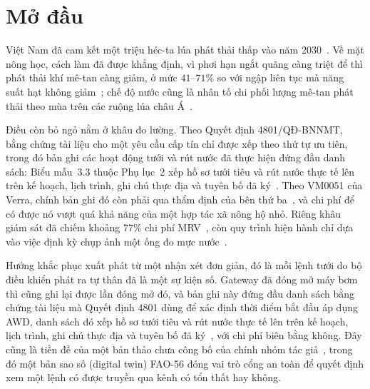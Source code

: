 \section{Mở đầu}
\label{sec:intro}

Việt Nam đã cam kết một triệu héc-ta lúa phát thải thấp vào năm 2030~\cite{qd1490}.
Về mặt nông học, cách làm đã được khẳng định, vì phơi hạn ngắt quãng càng triệt
để thì phát thải khí mê-tan càng giảm, ở mức $41$--$71\%$ so với ngập liên tục mà
năng suất hạt không giảm~\cite{balaine2019}; chế độ nước cũng là nhân tố chi
phối lượng mê-tan phát thải theo mùa trên các ruộng lúa châu Á~\cite{yan2005}.

Điều còn bỏ ngỏ nằm ở khâu đo lường. Theo Quyết định 4801/QĐ-BNNMT, bằng chứng tài
liệu cho một yêu cầu cấp tín chỉ được xếp theo thứ tự ưu tiên, trong đó bản ghi các hoạt
động tưới và rút nước đã thực hiện đứng đầu danh sách: Biểu mẫu~3.3 thuộc Phụ lục~2 xếp
hồ sơ tưới tiêu và rút nước thực tế lên trên kế hoạch, lịch trình, ghi chú thực địa và
tuyên bố đã ký~\cite{qd4801}. Theo VM0051 của Verra, chính bản ghi đó còn phải qua thẩm
định của bên thứ ba~\cite{vm0051}, và chi phí để có được nó vượt quá khả năng của một
hợp tác xã nông hộ nhỏ. Riêng khâu giám sát đã chiếm khoảng $77\%$ chi
phí MRV~\cite{jem2026mrv}, còn quy trình hiện hành chỉ dựa vào việc định kỳ chụp ảnh
một ống đo mực nước~\cite{qd4801}.

Hướng khắc phục xuất phát từ một nhận xét đơn giản, đó là mỗi lệnh tưới do bộ điều khiển
phát ra tự thân đã là một sự kiện số. Gateway đã đóng mở máy bơm thì cũng ghi lại được
lần đóng mở đó, và bản ghi này đứng đầu danh sách bằng chứng tài liệu mà Quyết định 4801 dùng để xác định thời điểm bắt đầu áp dụng AWD, danh sách đó xếp hồ sơ tưới tiêu và rút nước thực tế lên trên kế hoạch, lịch trình, ghi chú thực địa và tuyên bố đã ký~\cite{qd4801}, với chi phí biên bằng không. Đây cũng là tiền đề của một bản thảo chưa công bố của chính nhóm tác giả~\cite{twingate2026}, trong đó một bản sao số
(digital twin) FAO-56 đóng vai trò cổng an toàn để quyết định xem một lệnh có được truyền
qua kênh có tổn thất hay không.

